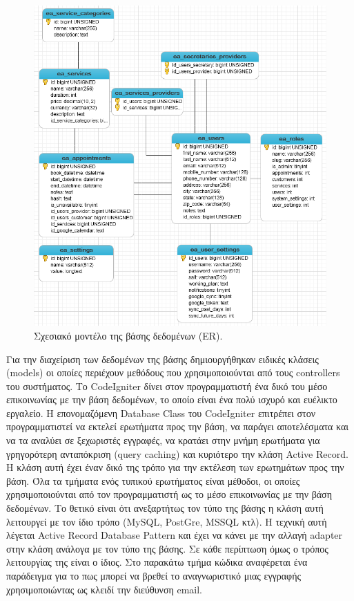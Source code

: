 \begin{figure}[ht!]
\centering
\includegraphics[width=160mm]{images/er.png}
\caption{Σχεσιακό μοντέλο της βάσης δεδομένων (ER).}
\label{er}
\end{figure}

Για την διαχείριση των δεδομένων της βάσης δημιουργήθηκαν ειδικές κλάσεις (models) οι οποίες περιέχουν μεθόδους που χρησιμοποιούνται από τους controllers του συστήματος. Το CodeIgniter δίνει στον προγραμματιστή ένα δικό του μέσο επικοινωνίας με την βάση δεδομένων, το οποίο είναι ένα πολύ ισχυρό και ευέλικτο εργαλείο. Η επονομαζόμενη Database Class του CodeIgniter επιτρέπει στον προγραμματιστεί να εκτελεί ερωτήματα προς την βάση, να παράγει αποτελέσματα και να τα αναλύει σε ξεχωριστές εγγραφές, να κρατάει στην μνήμη ερωτήματα για γρηγορότερη ανταπόκριση (query caching) και κυριότερο την κλάση Active Record. Η κλάση αυτή έχει έναν δικό της τρόπο για την εκτέλεση των ερωτημάτων προς την βάση. Όλα τα τμήματα ενός τυπικού ερωτήματος είναι μέθοδοι, οι οποίες χρησιμοποιούνται από τον προγραμματιστή ως το μέσο επικοινωνίας με την βάση δεδομένων. Το θετικό είναι ότι ανεξαρτήτως τον τύπο της βάσης η κλάση αυτή λειτουργεί με τον ίδιο τρόπο (MySQL, PostGre, MSSQL κτλ). Η τεχνική αυτή λέγεται Active Record Database Pattern και έχει να κάνει με την αλλαγή adapter στην κλάση ανάλογα με τον τύπο της βάσης. Σε κάθε περίπτωση όμως ο τρόπος λειτουργίας της είναι ο ίδιος. Στο παρακάτω τμήμα κώδικα αναφέρεται ένα παράδειγμα για το πως μπορεί να βρεθεί το αναγνωριστικό μιας εγγραφής χρησιμοποιώντας ως κλειδί την διεύθυνση email.

